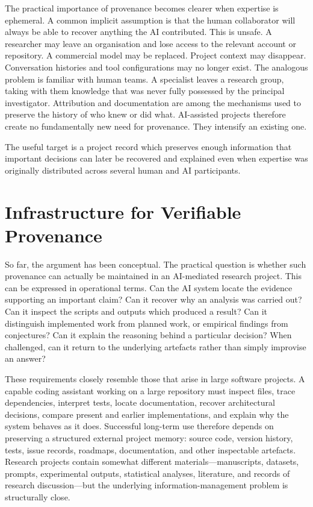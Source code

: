 \documentclass[12pt]{article}
\begin{document}
The practical importance of provenance becomes clearer when expertise is ephemeral. A common implicit assumption is that the human collaborator will always be able to recover anything the AI contributed. This is unsafe. A researcher may leave an organisation and lose access to the relevant account or repository. A commercial model may be replaced. Project context may disappear. Conversation histories and tool configurations may no longer exist.
The analogous problem is familiar with human teams. A specialist leaves a research group, taking with them knowledge that was never fully possessed by the principal investigator. Attribution and documentation are among the mechanisms used to preserve the history of who knew or did what. AI-assisted projects therefore create no fundamentally new need for provenance. They intensify an existing one.

The useful target is a project record which preserves enough information that important decisions can later be recovered and explained even when expertise was originally distributed across several human and AI participants.


\section{Infrastructure for Verifiable Provenance}

So far, the argument has been conceptual. The practical question is whether such provenance can actually be maintained in an AI-mediated research project.
This can be expressed in operational terms.
Can the AI system locate the evidence supporting an important claim? Can it recover why an analysis was carried out? Can it inspect the scripts and outputs which produced a result? Can it distinguish implemented work from planned work, or empirical findings from conjectures? Can it explain the reasoning behind a particular decision? When challenged, can it return to the underlying artefacts rather than simply improvise an answer?

These requirements closely resemble those that arise in large software projects.
A capable coding assistant working on a large repository must inspect files, trace dependencies, interpret tests, locate documentation, recover architectural decisions, compare present and earlier implementations, and explain why the system behaves as it does. Successful long-term use therefore depends on preserving a structured external project memory: source code, version history, tests, issue records, roadmaps, documentation, and other inspectable artefacts.
Research projects contain somewhat different materials---manuscripts, datasets, prompts, experimental outputs, statistical analyses, literature, and records of research discussion---but the underlying information-management problem is structurally close.
\end{document}
